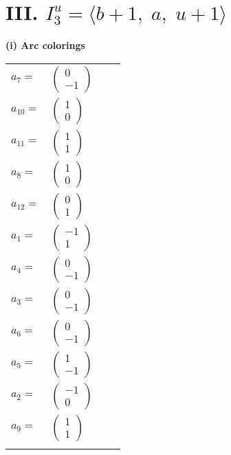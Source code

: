 \documentclass[1p]{elsarticle_modified}
\theoremstyle{definition}
\begin{document}
\centering \section*{III. $I^u_{3}= \langle b+1,\;a,\;u+1 \rangle$}
\flushleft \textbf{(i) Arc colorings}\\
\begin{tabular}{m{7pt} m{180pt} m{7pt} m{180pt} }
\flushright $a_{7}=$&$\begin{pmatrix}0\\-1\end{pmatrix}$ \\
\flushright $a_{10}=$&$\begin{pmatrix}1\\0\end{pmatrix}$ \\
\flushright $a_{11}=$&$\begin{pmatrix}1\\1\end{pmatrix}$ \\
\flushright $a_{8}=$&$\begin{pmatrix}1\\0\end{pmatrix}$ \\
\flushright $a_{12}=$&$\begin{pmatrix}0\\1\end{pmatrix}$ \\
\flushright $a_{1}=$&$\begin{pmatrix}-1\\1\end{pmatrix}$ \\
\flushright $a_{4}=$&$\begin{pmatrix}0\\-1\end{pmatrix}$ \\
\flushright $a_{3}=$&$\begin{pmatrix}0\\-1\end{pmatrix}$ \\
\flushright $a_{6}=$&$\begin{pmatrix}0\\-1\end{pmatrix}$ \\
\flushright $a_{5}=$&$\begin{pmatrix}1\\-1\end{pmatrix}$ \\
\flushright $a_{2}=$&$\begin{pmatrix}-1\\0\end{pmatrix}$ \\
\flushright $a_{9}=$&$\begin{pmatrix}1\\1\end{pmatrix}$\\&\end{tabular}
\end{document}

